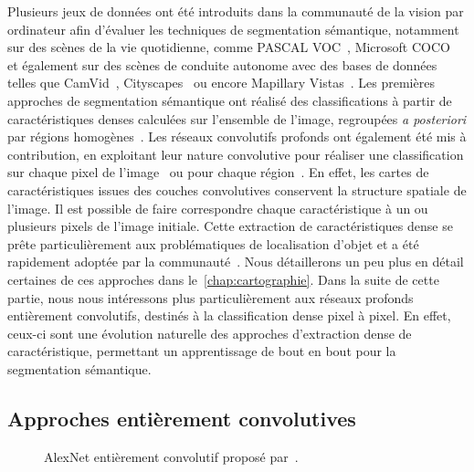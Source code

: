 Plusieurs jeux de données ont été introduits dans la communauté de la vision par ordinateur afin d'évaluer les techniques de segmentation sémantique, notamment sur des scènes de la vie quotidienne, comme PASCAL VOC~\cite{everingham_pascal_2014}, Microsoft COCO~\cite{lin_microsoft_2014} et également sur des scènes de conduite autonome avec des bases de données telles que CamVid~\cite{brostow_semantic_2009}, Cityscapes~\cite{cordts_cityscapes_2016} ou encore Mapillary Vistas~\cite{neuhold_mapillary_2017}. Les premières approches de segmentation sémantique ont réalisé des classifications à partir de caractéristiques denses calculées sur l'ensemble de l'image, regroupées \emph{a posteriori} par régions homogènes~\cite{shotton_semantic_2008,shotton_real-time_2011}. Les réseaux convolutifs profonds ont également été mis à contribution, en exploitant leur nature convolutive pour réaliser une classification sur chaque pixel de l'image~\cite{grangier_deep_2009,ciresan_deep_2012} ou pour chaque région~\cite{farabet_towards_2013,sermanet_overfeat_2013}. En effet, les cartes de caractéristiques issues des couches convolutives conservent la structure spatiale de l'image. Il est possible de faire correspondre chaque caractéristique à un ou plusieurs pixels de l'image initiale. Cette extraction de caractéristiques dense se prête particulièrement aux problématiques de localisation d'objet et a été rapidement adoptée par la communauté~\cite{zou_generic_2014}. Nous détaillerons un peu plus en détail certaines de ces approches dans le~\cref{chap:cartographie}. Dans la suite de cette partie, nous nous intéressons plus particulièrement aux réseaux profonds entièrement convolutifs, destinés à la classification dense pixel à pixel. En effet, ceux-ci sont une évolution naturelle des approches d'extraction dense de caractéristique, permettant un apprentissage de bout en bout pour la segmentation sémantique.

\subsection{Approches entièrement convolutives}

\begin{figure}
  \resizebox{\textwidth}{!}{%
  
  }
  \caption[AlexNet entièrement convolutif]{AlexNet entièrement convolutif proposé par~\citet{long_fully_2015}.}
  \label{fig:alexnet_fcn}
\end{figure}

